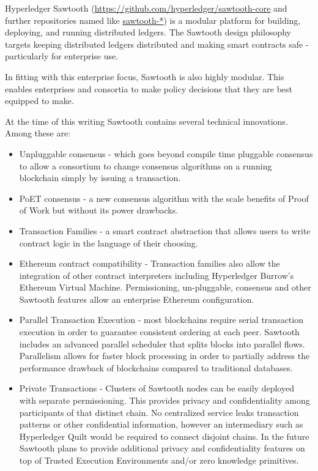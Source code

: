 Hyperledger Sawtooth (\url{https://github.com/hyperledger/sawtooth-core} and further repositories named like \url{sawtooth-*}) is a modular platform for building, deploying, and running distributed ledgers. The Sawtooth design philosophy targets keeping distributed ledgers distributed and making smart contracts safe - particularly for enterprise use.

In fitting with this enterprise focus, Sawtooth is also highly modular. This enables enterprises and consortia to make policy decisions that they are best equipped to make.

At the time of this writing Sawtooth contains several technical innovations. Among these are:
\begin{itemize}
\item Unpluggable consensus - which goes beyond compile time pluggable consensus to allow a consortium to change consensus algorithms on a running blockchain simply by issuing a transaction.
\item PoET consensus - a new consensus algorithm with the scale benefits of Proof of Work but without its power drawbacks.
\item Transaction Families - a smart contract abstraction that allows users to write contract logic in the language of their choosing.
\item Ethereum contract compatibility - Transaction families also allow the integration of other contract interpreters including Hyperledger Burrow's Ethereum Virtual Machine. Permissioning, un-pluggable, consensus and other Sawtooth features allow an enterprise Ethereum configuration.
\item Parallel Transaction Execution - most blockchains require serial transaction execution in order to guarantee consistent ordering at each peer. Sawtooth includes an advanced parallel scheduler that splits blocks into parallel flows. Parallelism allows for faster block processing in order to partially address the performance drawback of blockchains compared to traditional databases.
\item Private Transactions - Clusters of Sawtooth nodes can be easily deployed with separate permissioning. This provides privacy and confidentiality among participants of that distinct chain. No centralized service leaks transaction patterns or other confidential information, however an intermediary such as Hyperledger Quilt would be required to connect disjoint chains. In the future Sawtooth plans to provide additional privacy and confidentiality features on top of Trusted Execution Environments and/or zero knowledge primitives.
\end{itemize}

